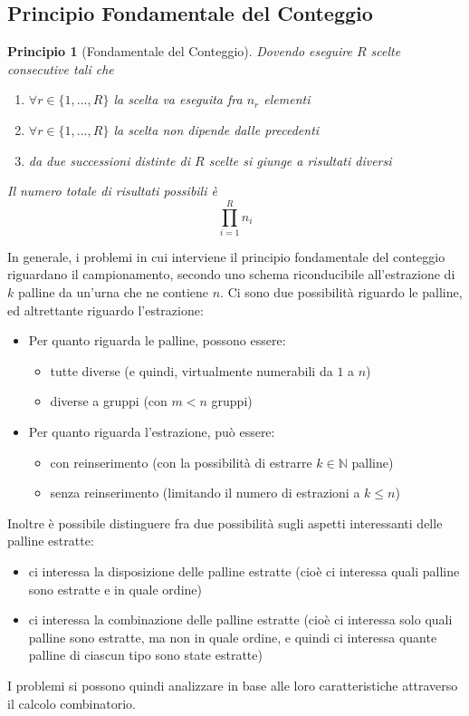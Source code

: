 \documentclass{article}
\theoremstyle{plain}
\newtheorem*{principio}{Principio}
\theoremstyle{definition}
\theoremstyle{remark}
\begin{document}
\subsection{Principio Fondamentale del Conteggio} %
\label{sub:principio_fondamentale_del_conteggio}
\begin{principio}[Fondamentale del Conteggio]
	Dovendo eseguire $R$ scelte consecutive tali che
	\begin{enumerate}
		\item $\forall r\in\{1,...,R\}$ la scelta va eseguita fra $n_r$ elementi
		\item $\forall r\in\{1,...,R\}$ la scelta non dipende dalle precedenti
		\item da due successioni distinte di $R$ scelte si giunge a risultati diversi
	\end{enumerate}
	Il numero totale di risultati possibili è
	\begin{equation*}
		\prod_{i=1}^R n_i
	\end{equation*}
\end{principio}
In generale, i problemi in cui interviene il principio fondamentale del conteggio riguardano il campionamento, secondo uno schema riconducibile all'estrazione di $k$ palline da un'urna che ne contiene $n$. Ci sono due possibilità riguardo le palline, ed altrettante riguardo l'estrazione:
\begin{itemize}
	\item Per quanto riguarda le palline, possono essere:
	\begin{itemize}
		\item tutte diverse (e quindi, virtualmente numerabili da $1$ a $n$)
		\item diverse a gruppi (con $m<n$ gruppi)
	\end{itemize}
	\item Per quanto riguarda l'estrazione, può essere:
	\begin{itemize}
		\item con reinserimento (con la possibilità di estrarre $k\in\mathbb{N}$ palline)
		\item senza reinserimento (limitando il numero di estrazioni a $k\leq n$)
	\end{itemize}
\end{itemize}
Inoltre è possibile distinguere fra due possibilità sugli aspetti interessanti delle palline estratte:
\begin{itemize}
	\item ci interessa la disposizione delle palline estratte (cioè ci interessa quali palline sono estratte e in quale ordine)
	\item ci interessa la combinazione delle palline estratte (cioè ci interessa solo quali palline sono estratte, ma non in quale ordine, e quindi ci interessa quante palline di ciascun tipo sono state estratte)
\end{itemize}
I problemi si possono quindi analizzare in base alle loro caratteristiche attraverso il calcolo combinatorio.
\end{document}
